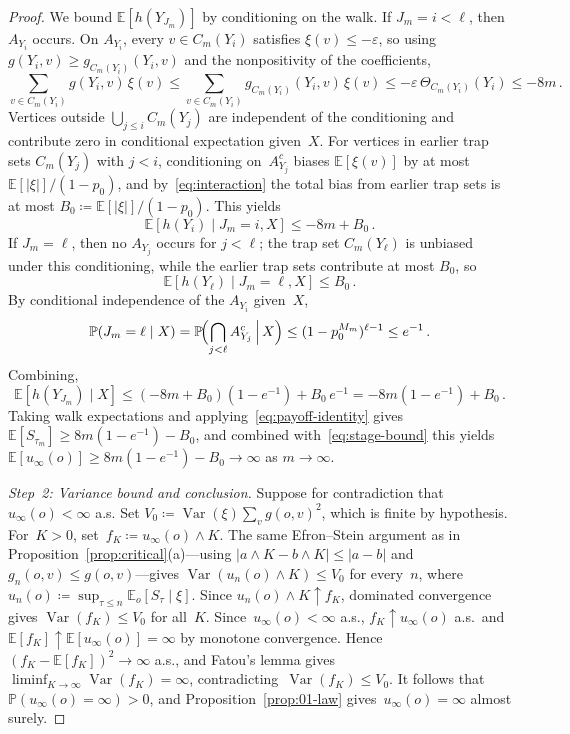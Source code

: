 \documentclass[11pt]{amsart}
\theoremstyle{plain}
\theoremstyle{definition}
\newcommand{\E}{\mathbb{E}}
\renewcommand{\P}{\mathbb{P}}
\DeclareMathOperator{\var}{Var}
\begin{document}
\begin{proof}
		We bound $\E[h(Y_{J_m})]$ by conditioning on the walk. If $J_m=i<\ell$, then $A_{Y_i}$ occurs. On $A_{Y_i}$, every $v\in C_m(Y_i)$ satisfies $\xi(v)\leq-\varepsilon$, so using $g(Y_i,v)\geq g_{C_m(Y_i)}(Y_i,v)$ and the nonpositivity of the coefficients,
		\[
		\sum_{v\in C_m(Y_i)}g(Y_i,v)\,\xi(v)\leq\sum_{v\in C_m(Y_i)}g_{C_m(Y_i)}(Y_i,v)\,\xi(v)\leq -\varepsilon\,\Theta_{C_m(Y_i)}(Y_i)\leq -8m\,.
		\]
		Vertices outside $\bigcup_{j\leq i}C_m(Y_j)$ are independent of the conditioning and contribute zero in conditional expectation given~$X$. For vertices in earlier trap sets $C_m(Y_j)$ with $j<i$, conditioning on~$A_{Y_j}^c$ biases $\E[\xi(v)]$ by at most $\E[|\xi|]/(1-p_0)$, and by~\eqref{eq:interaction} the total bias from earlier trap sets is at most $B_0\coloneqq\E[|\xi|]/(1-p_0)$. This yields
		\[
		\E[h(Y_i)\mid J_m=i,X]\leq -8m+B_0\,.
		\]
		If $J_m=\ell$, then no $A_{Y_j}$ occurs for $j<\ell$; the trap set $C_m(Y_\ell)$ is unbiased under this conditioning, while the earlier trap sets contribute at most $B_0$, so
		\[
		\E[h(Y_\ell)\mid J_m=\ell,X]\leq B_0\,.
		\]
		By conditional independence of the $A_{Y_i}$ given~$X$,
		\[
		\P(J_m=\ell\mid X)=\P\!\Bigl(\bigcap_{j<\ell}A_{Y_j}^c\,\Big|\,X\Bigr)\leq(1-p_0^{M_m})^{\ell-1}\leq e^{-1}\,.
		\]
		Combining,
		\[
		\E[h(Y_{J_m})\mid X]\leq(-8m+B_0)(1-e^{-1})+B_0\,e^{-1}=-8m(1-e^{-1})+B_0\,.
		\]
		Taking walk expectations and applying~\eqref{eq:payoff-identity} gives $\E[S_{\tau_m}]\geq 8m(1-e^{-1})-B_0$, and combined with~\eqref{eq:stage-bound} this yields $\E[u_\infty(o)]\geq 8m(1-e^{-1})-B_0\to\infty$ as $m\to\infty$.
		
		\medskip
		
		\emph{Step~2: Variance bound and conclusion.}
		Suppose for contradiction that $u_\infty(o)<\infty$ a.s. Set $V_0\coloneqq\var(\xi)\sum_v g(o,v)^2$, which is finite by hypothesis.
		For~$K>0$, set~$f_K\coloneqq u_\infty(o)\wedge K$. The same Efron--Stein argument as in Proposition~\ref{prop:critical}(a)---using $|a\wedge K-b\wedge K|\leq|a-b|$ and $g_n(o,v)\leq g(o,v)$---gives $\var(u_n(o)\wedge K)\leq V_0$ for every~$n$, where $u_n(o)\coloneqq\sup_{\tau\leq n}\E_o[S_\tau\mid\xi]$. Since $u_n(o)\wedge K\uparrow f_K$, dominated convergence gives $\var(f_K)\leq V_0$ for all~$K$.
		Since~$u_\infty(o)<\infty$ a.s., $f_K\uparrow u_\infty(o)$ a.s.\ and~$\E[f_K]\uparrow\E[u_\infty(o)]=\infty$ by monotone convergence.
		Hence~$(f_K-\E[f_K])^2\to\infty$ a.s., and Fatou's lemma gives~$\liminf_{K\to\infty}\var(f_K)=\infty$, contradicting~$\var(f_K)\leq V_0$.
		It follows that~$\P(u_\infty(o)=\infty)>0$, and Proposition~\ref{prop:01-law} gives~$u_\infty(o)=\infty$ almost surely.
	\end{proof}
	
\end{document}
